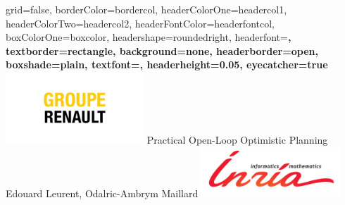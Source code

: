 \documentclass[paperwidth=36in, paperheight=48in,portrait,fontscale=0.35, margin=2cm]{baposter}
\begin{document}
\begin{poster}{
grid=false,
borderColor=bordercol, %
headerColorOne=headercol1, %
headerColorTwo=headercol2, %
headerFontColor=headerfontcol, %
boxColorOne=boxcolor, %
headershape=roundedright, %
headerfont=\Large\bf\textsc, %
textborder=rectangle,
background=none,
headerborder=open, %
boxshade=plain,
textfont={\setlength{\parindent}{0.0em}\sffamily},
headerheight={0.05\textheight},
eyecatcher=true
}
%
%
{
\includegraphics[width=14em]{./img/renault_group}
}
{
Practical Open-Loop Optimistic Planning
}
{
Edouard Leurent, Odalric-Ambrym Maillard
\vspace{-3\baselineskip}
}
{
\includegraphics[width=14em]{./img/inria_sc}
}

\setlength{\colheight}{0.92\textheight}



\end{poster}
\end{document}
